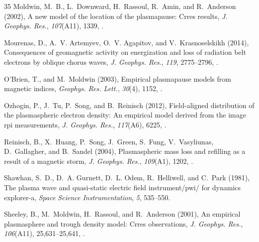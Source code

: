 \documentclass[a4paper]{article}
\renewenvironment{thebibliography}[1]{\begin{oldthebibliography}{#1}\setlength{\parskip}{0ex}\setlength{\itemsep}{0ex}}{\end{oldthebibliography}}
\begin{document}
\begin{thebibliography}{35}
Moldwin, M.~B., L.~Downward, H.~Rassoul, R.~Amin, and R.~Anderson (2002), A new
  model of the location of the plasmapause: Crres results, \textit{J. Geophys.
  Res.}, \textit{107}(A11), 1339, .

{Mourenas}, D., A.~V. {Artemyev}, O.~V. {Agapitov}, and V.~{Krasnoselskikh}
  (2014), Consequences of geomagnetic activity on energization and loss of
  radiation belt electrons by oblique chorus waves, \textit{J. Geophys. Res.},
  \textit{119}, 2775--2796, .

O'Brien, T., and M.~Moldwin (2003), Empirical plasmapause models from magnetic
  indices, \textit{Geophys. Res. Lett.}, \textit{30}(4), 1152,
  .

Ozhogin, P., J.~Tu, P.~Song, and B.~Reinisch (2012), Field-aligned distribution
  of the plasmaspheric electron density: An empirical model derived from the
  image rpi measurements, \textit{J. Geophys. Res.}, \textit{117}(A6), 6225,
  .

Reinisch, B., X.~Huang, P.~Song, J.~Green, S.~Fung, V.~Vasyliunas,
  D.~Gallagher, and B.~Sandel (2004), Plasmaspheric mass loss and refilling as
  a result of a magnetic storm, \textit{J. Geophys. Res.}, \textit{109}(A1),
  1202, .

Shawhan, S.~D., D.~A. Gurnett, D.~L. Odem, R.~Helliwell, and C.~Park (1981),
  The plasma wave and quasi-static electric field instrument/pwi/ for dynamics
  explorer-a, \textit{Space Science Instrumentation}, \textit{5}, 535--550.

Sheeley, B., M.~Moldwin, H.~Rassoul, and R.~Anderson (2001), An empirical
  plasmasphere and trough density model: Crres observations, \textit{J.
  Geophys. Res.}, \textit{106}(A11), 25,631--25,641,
  .


\end{thebibliography}
\end{document}
